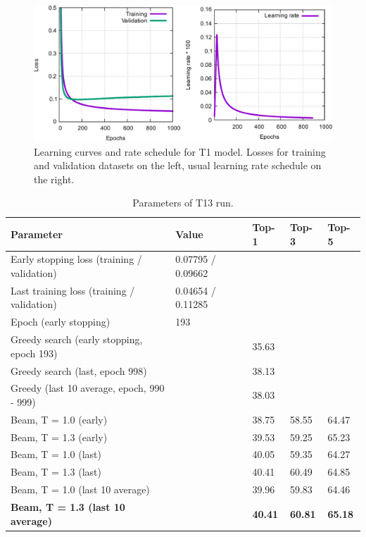 \documentclass{article}
\begin{document}
\begin{figure}[h!]
  \centering
  \includegraphics[width = 16.5cm]{images/t1-3.pdf}
  \caption{Learning curves and rate schedule for T1 model. Losses for training and validation datasets on the left, usual learning rate schedule on the right.}
  \label{fig:t11}
\end{figure}

\begin{table}[h!]
\caption{Parameters of T13 run.}
  \centering
  \begin{tabular}{p{6.2cm}p{3.5cm}p{1.5cm}p{1.5cm}p{1.5cm}}
    \toprule
    Parameter & Value & Top-1 & Top-3 & Top-5 \\
    \midrule
    Early stopping loss (training / validation) &  0.07795 / 0.09662 & & & \\
    Last training loss (training / validation) &  0.04654 / 0.11285  & & & \\
    Epoch (early stopping) & 193 & & & \\
    \midrule
    Greedy search (early stopping, epoch 193) &  & 35.63 & &\\
    Greedy search (last, epoch 998) &  & 38.13 & & \\
    Greedy (last 10 average, epoch, 990 - 999) & & 38.03 & & \\
    \midrule
    Beam, T = 1.0 (early) & & 38.75 & 58.55 &  64.47 \\
    Beam, T = 1.3 (early) & & 39.53 & 59.25 & 65.23 \\ 
    \midrule
    Beam, T = 1.0 (last) & & 40.05 & 59.35 &  64.27 \\
    Beam, T = 1.3 (last) & & 40.41 & 60.49 &  64.85 \\ 
    \midrule
    Beam, T = 1.0 (last 10 average) & & 39.96 & 59.83 & 64.46  \\
    \textbf{Beam, T = 1.3 (last 10 average)} & & \textbf{40.41}  & \textbf{60.81} & \textbf{65.18}  \\ 
    \bottomrule
  \end{tabular}
  \label{tbl:t13}

\end{table} 
\end{document}
